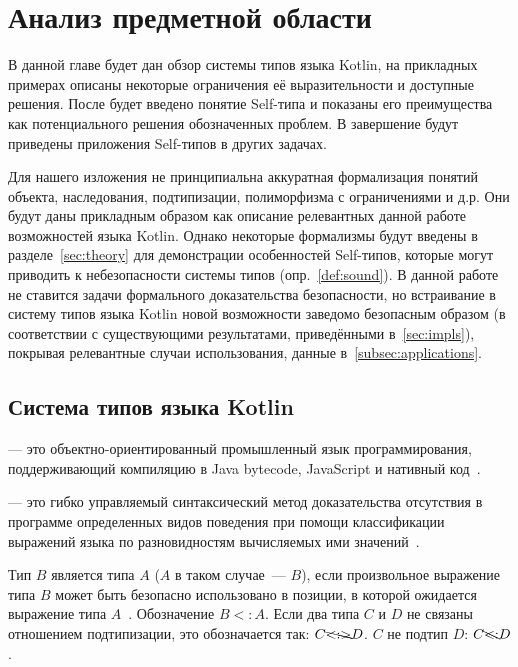 

\section{Анализ предметной области}

В данной главе будет дан обзор системы типов языка Kotlin, на прикладных примерах описаны некоторые ограничения её выразительности и доступные решения.
После будет введено понятие Self-типа и показаны его преимущества как потенциального решения обозначенных проблем.
В завершение будут приведены приложения Self-типов в других задачах.

Для нашего изложения не принципиальна аккуратная формализация понятий объекта, наследования, подтипизации, полиморфизма с ограничениями и д.р.
Они будут даны прикладным образом как описание релевантных данной работе возможностей языка Kotlin.
Однако некоторые формализмы будут введены в разделе~\ref{sec:theory} для демонстрации особенностей Self-типов, которые могут приводить к небезопасности системы типов (опр.~\ref{def:sound}).
В данной работе не ставится задачи формального доказательства безопасности, но встраивание в систему типов языка Kotlin новой возможности заведомо безопасным образом (в соответствии с существующими результатами, приведёнными в~\ref{sec:impls}), покрывая релевантные случаи использования, данные в~\ref{subsec:applications}.


\subsection{Система типов языка Kotlin}

 --- это объектно-ориентированный промышленный язык программирования, поддерживающий компиляцию в Java bytecode, JavaScript и нативный код~\cite{jemerov2017kotlin}.

\begin{definition}
     --- это гибко управляемый синтаксический метод доказательства отсутствия в программе определенных видов поведения при помощи классификации выражений языка по разновидностям вычисляемых ими значений~\cite{pierce2002types}.
\end{definition}

\begin{definition}
    \label{def:subtype}
    Тип $B$ является  типа $A$ ($A$ в таком случае~---  $B$), если произвольное выражение типа $B$ может быть безопасно использовано в позиции, в которой ожидается выражение типа $A$~\cite{liskov1987keynote, pierce2002types}.
    Обозначение $B <: A$.
    Если два типа $C$ и $D$ не связаны отношением подтипизации, это обозначается так: $C \bcancel{<:>} D$.
    $C$ не подтип $D$: $C \bcancel{<:} D$.
\end{definition}

